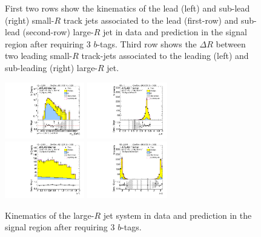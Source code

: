 \begin{figure}[htbp!]
\begin{center}
  \caption{First two rows show the kinematics of the lead (left) and sub-lead (right) small-$R$ track jets associated to the lead (first-row) and sub-lead (second-row) large-$R$ jet in data and prediction in the signal region after requiring 3 $b$-tags. Third row shows the $\Delta R$ between two leading small-$R$ track-jets associated to the leading (left) and sub-leading (right) large-$R$ jet.  }
  \label{fig:boosted-3b-signal-ak2}
\end{center}
\end{figure}


\begin{figure}[htbp!]
\begin{center}
\includegraphics[width=0.31\textwidth,angle=-90]{figures/boosted/Signal/b77_ThreeTag_Signal_mHH_l_1.pdf}
\includegraphics[width=0.31\textwidth,angle=-90]{figures/boosted/Signal/b77_ThreeTag_Signal_hCandDr.pdf}\\
\includegraphics[width=0.31\textwidth,angle=-90]{figures/boosted/Signal/b77_ThreeTag_Signal_hCandDeta.pdf}
\includegraphics[width=0.31\textwidth,angle=-90]{figures/boosted/Signal/b77_ThreeTag_Signal_hCandDphi.pdf}
  \caption{Kinematics of the large-$R$ jet system in data and prediction in the signal region after requiring 3 $b$-tags.  }
  \label{fig:boosted-3b-signal-ak10-system}
\end{center}
\end{figure}

